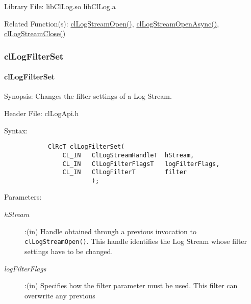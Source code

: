 \begin{flushleft}
\begin{Desc}
\end{Desc}
\begin{Desc}
\item[Library File:] libClLog.so\newline
libClLog.a\end{Desc}
\begin{Desc}
\item[Related Function(s):]\hyperlink{pagelog106}{clLogStreamOpen()}, \hyperlink{pagelog106}{clLogStreamOpenAsync()},
\hyperlink{pagelog108}{clLogStreamClose()}\end{Desc}
\newpage	








\subsubsection{clLogFilterSet}
\hypertarget{pagelog110}{}\paragraph{cl\-Log\-Filter\-Set}\label{pagelog110}
\begin{Desc}
\item[Synopsis:]Changes the filter settings of a Log Stream.\end{Desc}
\begin{Desc}
\item[Header File:] clLogApi.h \end{Desc}
\begin{Desc}
\item[Syntax:]
\footnotesize\begin{verbatim}        	
			ClRcT clLogFilterSet(
				CL_IN	ClLogStreamHandleT	hStream,
				CL_IN	ClLogFilterFlagsT	logFilterFlags,
				CL_IN	ClLogFilterT		filter
					    );
\end{verbatim}
\normalsize
\end{Desc}
\begin{Desc}
\item[Parameters:] \begin{description}
\item[{\em hStream}]:(in) Handle obtained through a previous invocation to {\tt{clLogStreamOpen()}}. This handle identifies the Log Stream whose filter 
settings have to be changed.
\item[{\em logFilterFlags}]:(in) Specifies how the filter parameter must be used. This filter can overwrite any previous

\end{description}
\end{Desc}
\end{flushleft}
